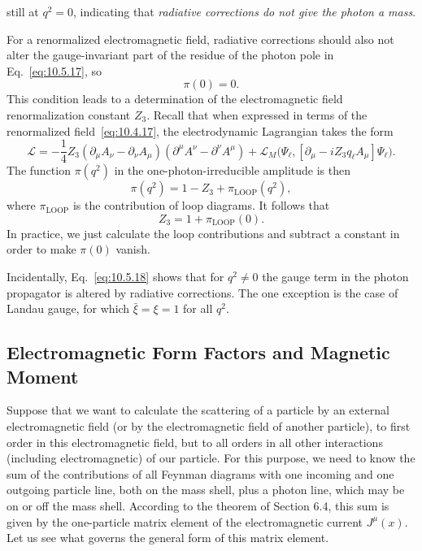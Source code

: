 
still at $q^2=0$, indicating that \emph{radiative corrections do not give the
photon a mass}.

For a renormalized electromagnetic field, radiative corrections should also
not alter the gauge-invariant part of the residue of the photon pole in
Eq.~\eqref{eq:10.5.17}, so
\begin{equation}
  \pi(0)=0.
  \tag{10.5.19}\label{eq:10.5.19}
\end{equation}
This condition leads to a determination of the electromagnetic field
renormalization constant $Z_3$. Recall that when expressed in terms of the
renormalized field~\eqref{eq:10.4.17}, the electrodynamic Lagrangian takes the
form
\begin{equation*}
  \mathcal L=-\frac14 Z_3(\partial_\mu A_\nu-\partial_\nu A_\mu)
  (\partial^\mu A^\nu-\partial^\nu A^\mu)
  +\mathcal L_M\bigl(\Psi_\ell,
  [\partial_\mu-iZ_3q_\ell A_\mu]\Psi_\ell\bigr).
\end{equation*}
The function $\pi(q^2)$ in the one-photon-irreducible amplitude is then
\begin{equation}
  \pi(q^2)=1-Z_3+\pi_{\mathrm{LOOP}}(q^2),
  \tag{10.5.20}\label{eq:10.5.20}
\end{equation}
where $\pi_{\mathrm{LOOP}}$ is the contribution of loop diagrams. It follows
that
\begin{equation}
  Z_3=1+\pi_{\mathrm{LOOP}}(0).
  \tag{10.5.21}\label{eq:10.5.21}
\end{equation}
In practice, we just calculate the loop contributions and subtract a constant
in order to make $\pi(0)$ vanish.

Incidentally, Eq.~\eqref{eq:10.5.18} shows that for $q^2\neq0$ the gauge term
in the photon propagator is altered by radiative corrections. The one
exception is the case of Landau gauge, for which $\bar\xi=\xi=1$ for all
$q^2$.

\subsection{Electromagnetic Form Factors and Magnetic Moment}

Suppose that we want to calculate the scattering of a particle by an external
electromagnetic field (or by the electromagnetic field of another particle),
to first order in this electromagnetic field, but to all orders in all other
interactions (including electromagnetic) of our particle. For this purpose,
we need to know the sum of the contributions of all Feynman diagrams with one
incoming and one outgoing particle line, both on the mass shell, plus a photon
line, which may be on or off the mass shell. According to the theorem of
Section 6.4, this sum is given by the one-particle matrix element of the
electromagnetic current $J^\mu(x)$. Let us see what governs the general form
of this matrix element.

